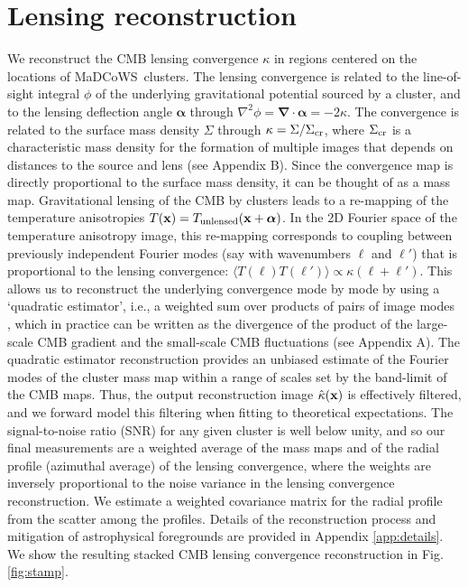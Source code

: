 \documentclass[preprint2]{aastex63}
\def\ellb{{\boldsymbol{ \ell}}}
\newcommand{\madcows}{MaDCoWS}
\begin{document}
\section{Lensing reconstruction}


We reconstruct the CMB lensing convergence $\kappa$ in regions centered on the locations of \madcows\ clusters. The lensing convergence is related to the line-of-sight integral $\phi$ of the underlying gravitational potential sourced by a cluster, and to the lensing deflection angle $\boldsymbol{\alpha}$ through $\nabla^2 \phi=\boldsymbol{\nabla}\cdot{\boldsymbol{\alpha}}=-2\kappa$. The convergence is related to the surface mass density $\Sigma$ through
$\kappa=\Sigma/\Sigma_{\rm cr}$, where $\Sigma_{\rm cr}$ is a characteristic mass density for the formation of multiple images that depends on distances to the source and lens (see Appendix B). Since the convergence map is directly proportional to the surface mass density, it can be thought of as a mass map. Gravitational lensing of the CMB by clusters leads to a re-mapping of the temperature anisotropies  $T({\bf x}) = T_{\rm unlensed}({\bf x} + \boldsymbol{\alpha})$. In the 2D Fourier space of the temperature anisotropy image, this re-mapping corresponds to coupling between previously independent Fourier modes (say with wavenumbers $\ellb$ and $\ellb'$) that is proportional to the lensing convergence: $\langle T({\boldsymbol \ell})T({\boldsymbol \ell}')  \rangle \propto \kappa(\ellb+\ellb') $. This allows us to reconstruct the underlying convergence mode by mode by using a `quadratic estimator', i.e., a weighted sum over products of pairs of image modes \citep{astro-ph/0701276}, which in practice can be written as the divergence of the product of the large-scale CMB gradient and the small-scale CMB fluctuations (see Appendix A). The quadratic estimator reconstruction provides an unbiased estimate of the Fourier modes of the cluster mass map within a range of scales set by the band-limit of the CMB maps. Thus, the output reconstruction image $\hat{\kappa}({\bf x})$ is effectively filtered, and we forward model this filtering when fitting to theoretical expectations. The signal-to-noise ratio (SNR) for any given cluster is well below unity, and so our final measurements are  a weighted average of the mass maps and of the radial profile (azimuthal average) of the lensing convergence, where the weights are inversely proportional to the noise variance in the lensing convergence reconstruction. We estimate a weighted covariance matrix for the radial profile from the scatter among the profiles. Details of the reconstruction process and mitigation of astrophysical foregrounds are provided in Appendix \ref{app:details}. We show the resulting stacked CMB lensing convergence reconstruction in Fig. \ref{fig:stamp}.
\end{document}

